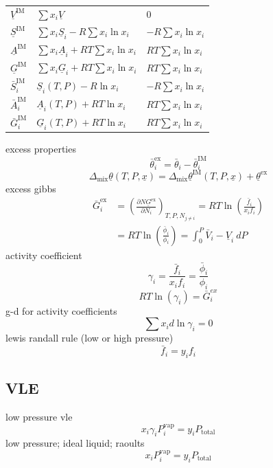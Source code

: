 \documentclass{article}
\begin{document}
\begin{minipage}[t]{0.47\textwidth}
\begin{center}
\begin{tabular}{@{}lll@{}}
            $\underline{V}^{\text{IM}}$                           & $\sum x_i \underline{V}$               & 0                           \\
            $\underline{S}^{\text{IM}}$                     & $\sum x_i \underline{S}_i - R \sum x_i \ln x_{i}$  & $-R \sum x_{i} \ln x_{i}$   \\
            $\underline{A}^{\text{IM}}$                     & $\sum x_i \underline{A}_i + RT \sum x_i \ln x_{i}$  & $RT \sum x_{i} \ln x_{i}$   \\
            $\underline{G}^{\text{IM}}$                     & $\sum x_i \underline{G}_i + RT \sum x_i \ln x_{i}$  & $RT \sum x_{i} \ln x_{i}$   \\
            $\bar{S}^{\text{IM}}_i$                     & $\underline{S}_i(T,P) - R \ln x_{i}$  & $-R \sum x_{i} \ln x_{i}$   \\
            $\bar{A}^{\text{IM}}_i$                    & $\underline{A}_i(T,P) + RT \ln x_{i}$ & $RT \sum x_{i} \ln x_{i}$   \\ 
            $\bar{G}^{\text{IM}}_i$                    & $\underline{G}_i(T,P) + RT \ln x_{i}$ & $RT \sum x_{i} \ln x_{i}$   \\             
            \bottomrule
        \end{tabular}
    \end{center}
    excess properties
    \[\bar{\theta}^{\text{ex}}_i = \bar{\theta}_{i} - \bar{\theta}^{\text{IM}}_{i}\]
    \[\Delta_{\text{mix}}\underline{\theta} (T,P,\underline{x}) = \Delta_{\text{mix}}\underline{\theta}^{\text{IM}}(T,P,\underline{x}) + \underline{\theta}^{\text{ex}}\]
    excess gibbs
    \begin{align*}
        \bar{G}^{\text{ex}}_{i} &= \left(\frac{ \partial N \underline{G}^{\text{ex}} }{ \partial N_{i} } \right)_{T,P,N_{j \neq i}}  
        = RT \ln \left( \frac{\bar{f}_{i}}{x_{i}f_{i}} \right)  \\ 
        &= RT \ln\left( \frac{\bar{\phi}_{i}}{\phi_{i}} \right) 
        = \int_{0}^P \bar{V}_{i} - \underline{V}_{i} \ dP
    \end{align*}
    activity coefficient
    \[\gamma_{i} = \frac{\bar{f}_{i}}{x_{i} f_{i}} = \frac{\bar{\phi}_{i}}{\phi_{i}} \]
    \[RT \ln (\gamma_{i}) = \bar{G}_{i}^{ex}\]
    g-d for activity coefficients
    \[\sum x_{i} d\ln \gamma_{i} = 0\]
    lewis randall rule (low or high pressure)
    \[\bar{f}_{i} = y_{i} f_{i} \]
    \subsection*{VLE}
    low pressure vle
    \[x_{i} \gamma_{i} P^{\text{vap}}_{i} = y_{i}P_{\text{total}}\]
    low pressure; ideal liquid; raoults
    \[x_{i} P^{\text{vap}}_{i} = y_{i} P_{\text{total}} \]
\end{minipage}
\end{document}
